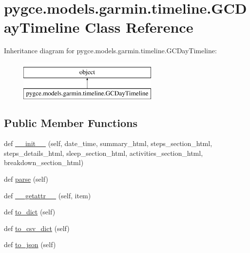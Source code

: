 \hypertarget{classpygce_1_1models_1_1garmin_1_1timeline_1_1_g_c_day_timeline}{}\section{pygce.\+models.\+garmin.\+timeline.\+G\+C\+Day\+Timeline Class Reference}
\label{classpygce_1_1models_1_1garmin_1_1timeline_1_1_g_c_day_timeline}
Inheritance diagram for pygce.\+models.\+garmin.\+timeline.\+G\+C\+Day\+Timeline\+:\begin{figure}[H]
\begin{center}
\leavevmode
\includegraphics[height=2.000000cm]{classpygce_1_1models_1_1garmin_1_1timeline_1_1_g_c_day_timeline}
\end{center}
\end{figure}
\subsection*{Public Member Functions}
\begin{DoxyCompactItemize}
\item 
def \hyperlink{classpygce_1_1models_1_1garmin_1_1timeline_1_1_g_c_day_timeline_a7ac2fc2ad2c247d5ac64c393e9e3c31e}{\+\_\+\+\_\+init\+\_\+\+\_\+} (self, date\+\_\+time, summary\+\_\+html, steps\+\_\+section\+\_\+html, steps\+\_\+details\+\_\+html, sleep\+\_\+section\+\_\+html, activities\+\_\+section\+\_\+html, breakdown\+\_\+section\+\_\+html)
\item 
def \hyperlink{classpygce_1_1models_1_1garmin_1_1timeline_1_1_g_c_day_timeline_a868c632c33e0deb2b2ebfccfa35aa839}{parse} (self)
\item 
def \hyperlink{classpygce_1_1models_1_1garmin_1_1timeline_1_1_g_c_day_timeline_ae2d3f754907b22c3a87715fa8664cb5d}{\+\_\+\+\_\+getattr\+\_\+\+\_\+} (self, item)
\item 
def \hyperlink{classpygce_1_1models_1_1garmin_1_1timeline_1_1_g_c_day_timeline_aea84908a12fe244f70ef0c7d6f9875b7}{to\+\_\+dict} (self)
\item 
def \hyperlink{classpygce_1_1models_1_1garmin_1_1timeline_1_1_g_c_day_timeline_a89b4a28c05fc57f7588f9aea91c2f5f3}{to\+\_\+csv\+\_\+dict} (self)
\item 
def \hyperlink{classpygce_1_1models_1_1garmin_1_1timeline_1_1_g_c_day_timeline_a45e446687d33554cb53dea0a2d052c1a}{to\+\_\+json} (self)
\end{DoxyCompactItemize}
